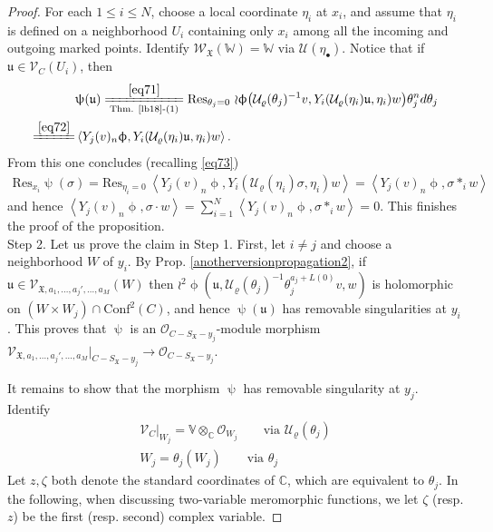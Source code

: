 \documentclass[11pt,b5paper,notitlepage]{article}
\theoremstyle{definition}
\theoremstyle{plain}
\newcommand{\fk}{\mathfrak}
\newcommand{\mc}{\mathcal}
\newcommand{\Conf}{\mathrm{Conf}}
\newcommand{\Res}{\mathrm{Res}}
\newcommand{\SV}{\mathscr{V}}
\newcommand{\scr}{\mathscr}
\newcommand{\SX}{{S_{\fk X}}}
\newcommand{\blt}{\bullet}
\newcommand{\Vbb}{\mathbb V}
\newcommand{\Wbb}{\mathbb W}
\newcommand{\Cbb}{\mathbb C}
\newcommand{\<}{\left\langle}
\renewcommand{\>}{\right\rangle}
\numberwithin{equation}{subsection}
\begin{document}
\begin{proof}
For each $1\leq i\leq N$, choose a local coordinate $\eta_i$ at $x_i$, and assume that $\eta_i$ is defined on a neighborhood $U_i$ containing only $x_i$ among all the incoming and outgoing marked points. Identify $\scr W_{\fk X}(\Wbb)=\Wbb$ via $\mc U(\eta_\blt)$. Notice that if $\fk u\in\SV_{C}(U_i)$, then
\begin{align}
&\uppsi(\fk u)\xlongequal[\text{Thm. \ref{lb18}-(1)}]{\eqref{eq71}}\Res_{\theta_j=0}~{\wr \upphi}\big(\mc U_\varrho(\theta_j)^{-1}v,Y_i(\mc U_\varrho(\eta_i)\fk u,\eta_i)w\big)\theta_j^n d\theta_j\nonumber\\
\xlongequal{\eqref{eq72}}&\<Y_j(v)_n \upphi,Y_i(\mc U_\varrho(\eta_i)\fk u,\eta_i)w\>.\label{eq70}
\end{align}
From this one concludes (recalling \eqref{eq73})
\begin{align*}
\Res_{x_i}\uppsi(\sigma)=\Res_{\eta_i=0}~\<Y_j(v)_n \upphi,Y_i(\mc U_\varrho(\eta_i)\sigma,\eta_i)w\>=\<Y_j(v)_n \upphi,\sigma*_iw\>
\end{align*}
and hence $\<Y_j(v)_n \upphi,\sigma\cdot w\>=\sum_{i=1}^N \<Y_j(v)_n \upphi,\sigma*_iw\>=0$. This finishes the proof of the proposition.\\








Step 2. Let us prove the claim in Step 1. First, let $i\neq j$ and choose a neighborhood  $W$ of $y_i$. By Prop. \ref{anotherversionpropagation2}, if $\fk u\in\scr V_{\fk X,a_1,\dots,a_j',\dots,a_M}(W)$ then $\wr^2\upphi(\fk u,\mc U_\varrho(\theta_j)^{-1}\theta_j^{a_j+L(0)}v,w)$ is holomorphic on $(W\times W_j)\cap\Conf^2(C)$, and hence $\uppsi(\fk u)$ has removable singularities at $y_i$.
This proves that $\uppsi$ is an $\mc O_{C-\SX-y_j}$-module morphism $\scr V_{\fk X,a_1,\dots,a_j',\dots,a_M}|_{C-\SX-y_j}\rightarrow\mc O_{C-\SX-y_j}$.




It remains to show that the morphism $\uppsi$ has removable singularity at $y_j$. Identify
\begin{subequations}\label{eq77}
\begin{gather}
\scr V_C|_{W_j}=\Vbb\otimes_\Cbb\mc O_{W_j} \qquad\text{via }\mc U_\varrho(\theta_j)\\
W_j=\theta_j(W_j)\qquad\text{via }\theta_j
\end{gather}
\end{subequations}
Let $z,\zeta$ both denote the standard coordinates of $\Cbb$, which are equivalent to $\theta_j$. In the following, when discussing two-variable meromorphic functions, we let $\zeta$ (resp. $z$) be the first (resp. second) complex variable.
        



\end{proof}
\end{document}
